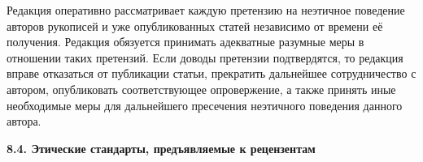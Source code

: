 \begin{enumerate}
Редакция оперативно рассматривает каждую претензию на неэтичное поведение авторов рукописей и уже опубликованных статей независимо от времени её получения. Редакция обязуется принимать адекватные разумные меры в отношении таких претензий. Если доводы претензии подтвердятся, то редакция вправе отказаться от публикации статьи, прекратить дальнейшее сотрудничество с автором, опубликовать соответствующее опровержение, а также принять иные необходимые меры для дальнейшего пресечения неэтичного поведения данного автора.





\end{enumerate}



\smallskip



\noindent

{\bf 8.4. Этические стандарты, предъявляемые к рецензентам}



